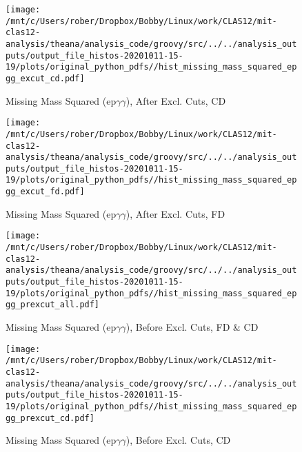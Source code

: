 \documentclass{article}
\begin{document}
\begin{landscape}
    \begin{figure}[h]
        \centering

        \texttt{[image: /mnt/c/Users/rober/Dropbox/Bobby/Linux/work/CLAS12/mit-clas12-analysis/theana/analysis\_code/groovy/src/../../analysis\_outputs/output\_file\_histos-20201011-15-19/plots/original\_python\_pdfs//hist\_missing\_mass\_squared\_epgg\_excut\_cd.pdf]}
        \captionsetup{textformat=empty,labelformat=blank}
        \caption{Missing Mass Squared (ep$\gamma$$\gamma$), After Excl. Cuts, CD}
    \end{figure}
    \clearpage
    
    \begin{figure}[h]
        \centering

        \texttt{[image: /mnt/c/Users/rober/Dropbox/Bobby/Linux/work/CLAS12/mit-clas12-analysis/theana/analysis\_code/groovy/src/../../analysis\_outputs/output\_file\_histos-20201011-15-19/plots/original\_python\_pdfs//hist\_missing\_mass\_squared\_epgg\_excut\_fd.pdf]}
        \captionsetup{textformat=empty,labelformat=blank}
        \caption{Missing Mass Squared (ep$\gamma$$\gamma$), After Excl. Cuts, FD}
    \end{figure}
    \clearpage
    
    \begin{figure}[h]
        \centering

        \texttt{[image: /mnt/c/Users/rober/Dropbox/Bobby/Linux/work/CLAS12/mit-clas12-analysis/theana/analysis\_code/groovy/src/../../analysis\_outputs/output\_file\_histos-20201011-15-19/plots/original\_python\_pdfs//hist\_missing\_mass\_squared\_epgg\_prexcut\_all.pdf]}
        \captionsetup{textformat=empty,labelformat=blank}
        \caption{Missing Mass Squared (ep$\gamma$$\gamma$), Before Excl. Cuts, FD \& CD}
    \end{figure}
    \clearpage
    
    \begin{figure}[h]
        \centering

        \texttt{[image: /mnt/c/Users/rober/Dropbox/Bobby/Linux/work/CLAS12/mit-clas12-analysis/theana/analysis\_code/groovy/src/../../analysis\_outputs/output\_file\_histos-20201011-15-19/plots/original\_python\_pdfs//hist\_missing\_mass\_squared\_epgg\_prexcut\_cd.pdf]}
        \captionsetup{textformat=empty,labelformat=blank}
        \caption{Missing Mass Squared (ep$\gamma$$\gamma$), Before Excl. Cuts, CD}
    \end{figure}
    \clearpage
    

\end{landscape}
\end{document}

